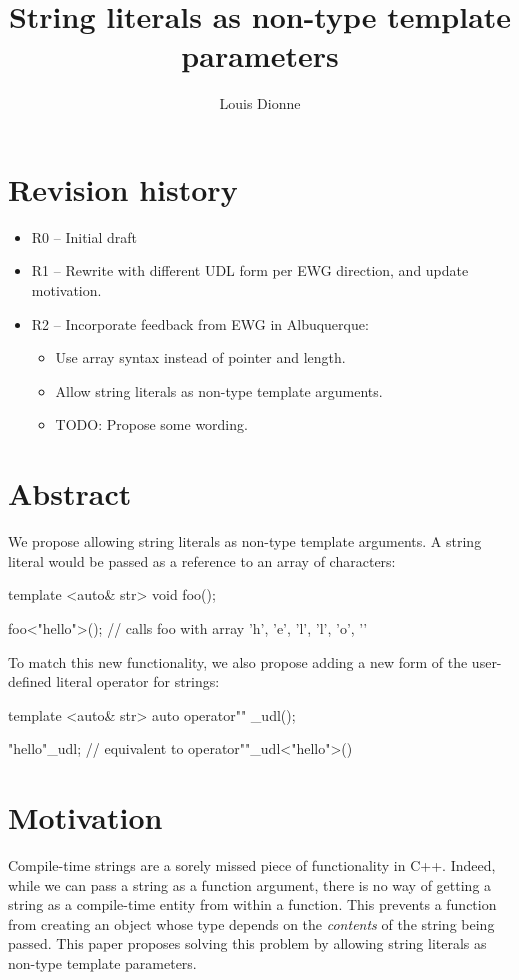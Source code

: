 \documentclass{wg21}
\title{String literals as non-type template parameters}
\author{Louis Dionne}{ldionne.2@gmail.com}
\begin{document}
\maketitle


\section{Revision history}
\begin{itemize}
  \item R0 -- Initial draft
  \item R1 -- Rewrite with different UDL form per EWG direction, and update motivation.
  \item R2 -- Incorporate feedback from EWG in Albuquerque:
              \begin{itemize}
                \item Use array syntax instead of pointer and length.
                \item Allow string literals as non-type template arguments.
                \item TODO: Propose some wording.
              \end{itemize}
\end{itemize}


\section{Abstract}
We propose allowing string literals as non-type template arguments. A string
literal would be passed as a reference to an array of characters:

\begin{cpp}
template <auto& str>
void foo();

foo<"hello">(); // calls foo with array {'h', 'e', 'l', 'l', 'o', '\0'}
\end{cpp}

To match this new functionality, we also propose adding a new form of the
user-defined literal operator for strings:

\begin{cpp}
template <auto& str>
auto operator"" _udl();

"hello"_udl; // equivalent to operator""_udl<"hello">()
\end{cpp}


\section{Motivation}
Compile-time strings are a sorely missed piece of functionality in C++.
Indeed, while we can pass a string as a function argument, there is no way
of getting a string as a compile-time entity from within a function. This
prevents a function from creating an object whose type depends on the
\emph{contents} of the string being passed. This paper proposes solving
this problem by allowing string literals as non-type template parameters.
\end{document}
